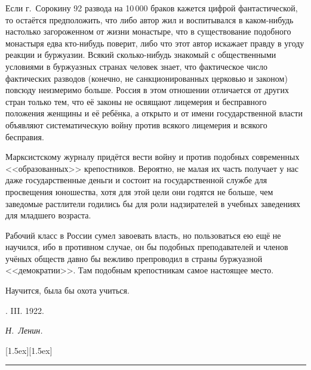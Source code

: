 Если г.~Сорокину 92 развода на 10\,000 браков кажется
цифрой фантастической, то остаётся предположить, что либо автор жил и
воспитывался в каком-нибудь настолько загороженном от жизни монастыре, что
в существование подобного монастыря едва кто-нибудь поверит, либо что этот
автор искажает правду в угоду реакции и буржуазии. Всякий сколько-нибудь
знакомый с общественными условиями в буржуазных странах человек знает, что
фактическое число фактических разводов (конечно, не санкционированных
церковью и законом) повсюду неизмеримо больше. Россия в этом отношении
отличается от других стран только тем, что её законы не освящают лицемерия
и бесправного положения женщины и её ребёнка, а открыто и от имени
государственной власти объявляют систематическую войну против всякого
лицемерия и всякого бесправия.

Марксистскому журналу придётся вести войну и против подобных современных
<<образованных>> крепостников. Вероятно, не малая их часть получает у нас даже
государственные деньги и состоит на государственной службе для просвещения
юношества, хотя для этой цели они годятся не больше, чем заведомые
растлители годились бы для роли надзирателей в учебных заведениях для
младшего возраста.

Рабочий класс в России сумел завоевать власть, но пользоваться ею ещё не
научился, ибо в противном случае, он бы подобных преподавателей и членов
учёных обществ давно бы вежливо препроводил в страны буржуазной
<<демократии>>. Там подобным крепостникам самое настоящее место.

\nopagebreak
Научится, была бы охота учиться.

\nopagebreak \medskip
{}. III. 1922.
\nopagebreak \medskip

{\raggedleft \textit{Н.~Ленин.} \par}

\nopagebreak \medskip
{\centering \raisebox{0}[1.5ex][1.5ex]{\rule{1.8cm}{0.4pt}} \par}

\bigskip
